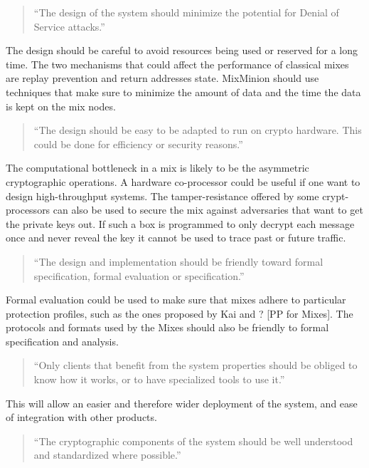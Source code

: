 \documentclass{article}
\begin{document}
\begin{quote}
     ``The design of the system should minimize the potential for
     Denial of Service attacks.''
\end{quote}

The design should be careful to avoid resources being used or reserved
for a long time. The two mechanisms that could affect the performance
of classical mixes are replay prevention and return addresses
state. MixMinion should use techniques that make sure to minimize the
amount of data and the time the data is kept on the mix nodes. 

\begin{quote}
     ``The design should be easy to be adapted to run on crypto
     hardware. This could be done for efficiency or security reasons.''
\end{quote}

The computational bottleneck in a mix is likely to be the asymmetric
cryptographic operations. A hardware co-processor could be useful if
one want to design high-throughput systems. The tamper-resistance
offered by some crypt-processors can also be used to secure the mix
against adversaries that want to get the private keys out. If such a
box is programmed to only decrypt each message once and never reveal
the key it cannot be used to trace past or future traffic.

\begin{quote}
     ``The design and implementation should be friendly toward formal
     specification, formal evaluation or specification.''
\end{quote}

Formal evaluation could be used to make sure that mixes adhere to
particular protection profiles, such as the ones proposed by Kai and ?
[PP for Mixes]. The protocols and formats used by the Mixes should
also be friendly to formal specification and analysis.

\begin{quote}
     ``Only clients that benefit from the system properties should be
     obliged to know how it works, or to have specialized tools to use
     it.''
\end{quote}

This will allow an easier and therefore wider deployment of the
system, and ease of integration with other products.

\begin{quote}
     ``The cryptographic components of the system should be well
     understood and standardized where possible.''
\end{quote}
\end{document}
